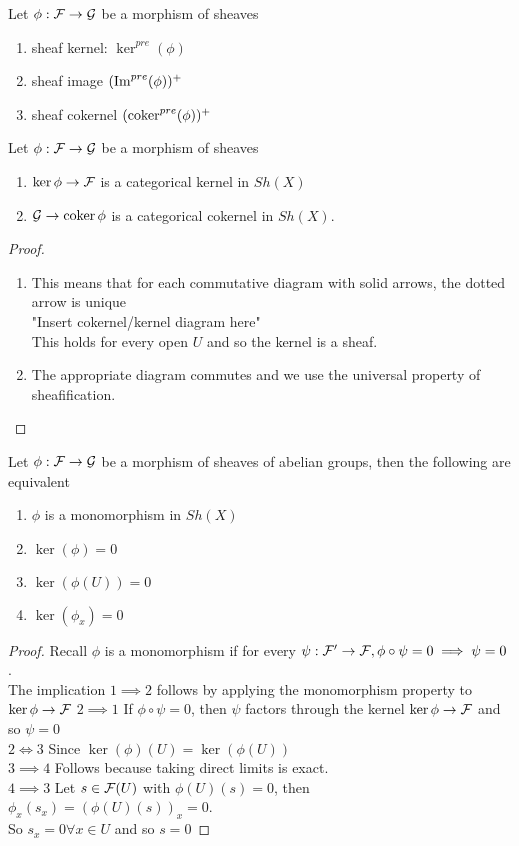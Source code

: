 \documentclass[../main.tex]{subfiles}
\begin{document}
\begin{defn}
	Let $\phi:\mathcal{F}\to \mathcal{G}$ be a morphism of sheaves
	\begin{enumerate}
	\item sheaf kernel: $\ker^{pre}( \phi) $ 
	\item sheaf image $( \operatorname{Im} ^{pre}( \phi) )^{+}$
	\item sheaf cokernel $( \operatorname{coker} ^{pre}( \phi) )^{+}$
	\end{enumerate}
	
\end{defn}
\begin{lemma}
Let $\phi:\mathcal{F}\to \mathcal{G}$ be a morphism of sheaves
\begin{enumerate}
\item $\ker\phi\to \mathcal{F}$ is a categorical kernel in $Sh( X) $ 
\item $\mathcal{G}\to \operatorname{coker}\phi$ is a categorical cokernel in $Sh( X) $.
\end{enumerate}
\end{lemma}
\begin{proof}
	\begin{enumerate}
	\item 
This means that for each commutative diagram with solid arrows, the dotted arrow is unique\\
"Insert cokernel/kernel diagram here"\\
This holds for every open $U$ and so the kernel is a sheaf.
\item The appropriate diagram commutes and we use the universal property of sheafification.
	\end{enumerate}
\end{proof}
\begin{propo}
Let $\phi:\mathcal{F}\to \mathcal{G}$ be a morphism of sheaves of abelian groups, then the following are equivalent
\begin{enumerate}
\item $\phi$ is a monomorphism in $Sh( X) $ 
\item $\ker( \phi) = 0 $ 
\item $\ker ( \phi( U) ) =0$ 
\item $\ker( \phi_x) = 0$ 
\end{enumerate}
\end{propo}
\begin{proof}
Recall $\phi$ is a monomorphism if for every $\psi: \mathcal{F}' \to \mathcal{F} , \phi\circ\psi = 0 \implies \psi= 0$ .\\
The implication $1 \implies 2$ follows by applying the monomorphism property to $\ker \phi \to \mathcal{F}$ 
$2 \implies 1$ If $\phi\circ\psi= 0$, then $\psi$ factors through the kernel $\ker\phi\to \mathcal{F}$ and so $\psi = 0$ \\
$2 \iff 3$ Since $\ker ( \phi) ( U) = \ker ( \phi( U) ) $ \\
$3 \implies 4$  Follows because taking direct limits is exact.\\
$4 \implies 3$ Let $s\in \mathcal{F}( U) $ with $\phi( U) ( s) =0$, then $\phi_x( s_x) = ( \phi( U) ( s) ) _x = 0$.\\
So $s_x =0 \forall x\in U$ and so $s =0$ 
\end{proof}
\end{document}
